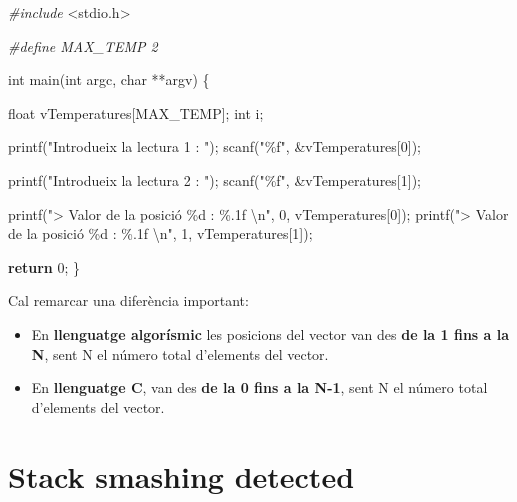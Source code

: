 \documentclass[]{book}
\newenvironment{Shaded}{\begin{snugshade}}{\end{snugshade}}
\newcommand{\ControlFlowTok}[1]{\textcolor[rgb]{0.13,0.29,0.53}{\textbf{#1}}}
\newcommand{\DataTypeTok}[1]{\textcolor[rgb]{0.13,0.29,0.53}{#1}}
\newcommand{\DecValTok}[1]{\textcolor[rgb]{0.00,0.00,0.81}{#1}}
\newcommand{\ImportTok}[1]{#1}
\newcommand{\NormalTok}[1]{#1}
\newcommand{\PreprocessorTok}[1]{\textcolor[rgb]{0.56,0.35,0.01}{\textit{#1}}}
\newcommand{\SpecialCharTok}[1]{\textcolor[rgb]{0.00,0.00,0.00}{#1}}
\newcommand{\StringTok}[1]{\textcolor[rgb]{0.31,0.60,0.02}{#1}}
\providecommand{\tightlist}{%
  \setlength{\itemsep}{0pt}\setlength{\parskip}{0pt}}
\begin{document}
\begin{Shaded}
\begin{Highlighting}[]
\PreprocessorTok{\#include }\ImportTok{\textless{}stdio.h\textgreater{}}

\PreprocessorTok{\#define MAX\_TEMP 2}

\DataTypeTok{int}\NormalTok{ main(}\DataTypeTok{int}\NormalTok{ argc, }\DataTypeTok{char}\NormalTok{ **argv) \{}

    \DataTypeTok{float}\NormalTok{ vTemperatures[MAX\_TEMP];}
    \DataTypeTok{int}\NormalTok{ i;}

\NormalTok{    printf(}\StringTok{"Introdueix la lectura 1 : "}\NormalTok{);}
\NormalTok{    scanf(}\StringTok{"\%f"}\NormalTok{, \&vTemperatures[}\DecValTok{0}\NormalTok{]);}

\NormalTok{    printf(}\StringTok{"Introdueix la lectura 2 : "}\NormalTok{);}
\NormalTok{    scanf(}\StringTok{"\%f"}\NormalTok{, \&vTemperatures[}\DecValTok{1}\NormalTok{]);}
    
\NormalTok{    printf(}\StringTok{"\textgreater{} Valor de la posició \%d : \%.1f }\SpecialCharTok{\textbackslash{}n}\StringTok{"}\NormalTok{, }\DecValTok{0}\NormalTok{, vTemperatures[}\DecValTok{0}\NormalTok{]);}
\NormalTok{    printf(}\StringTok{"\textgreater{} Valor de la posició \%d : \%.1f }\SpecialCharTok{\textbackslash{}n}\StringTok{"}\NormalTok{, }\DecValTok{1}\NormalTok{, vTemperatures[}\DecValTok{1}\NormalTok{]);}

    \ControlFlowTok{return} \DecValTok{0}\NormalTok{;}
\NormalTok{\}}
\end{Highlighting}
\end{Shaded}

Cal remarcar una diferència important:

\begin{itemize}
\tightlist
\item
  En \textbf{llenguatge algorísmic} les posicions del vector van des \textbf{de la 1 fins a la N}, sent N el número total d'elements del vector.
\item
  En \textbf{llenguatge C}, van des \textbf{de la 0 fins a la N-1}, sent N el número total d'elements del vector.
\end{itemize}

\hypertarget{stack-smashing-detected}{%
\section{Stack smashing detected}\label{stack-smashing-detected}}
\end{document}
